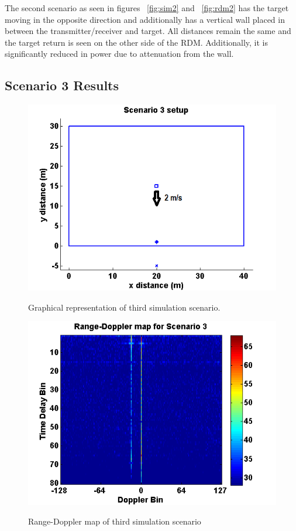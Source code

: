\documentclass[article,11pt,onecolumn,final]{IEEEtran}
\begin{document}
The second scenario as seen in figures ~\ref{fig:sim2} and ~\ref{fig:rdm2} has the target moving in the opposite direction and additionally has a vertical wall placed in between the transmitter/receiver and target. All distances remain the same and the target return is seen on the other side of the RDM. Additionally, it is significantly reduced in power due to attenuation from the wall.

\subsection{Scenario 3 Results}

\begin{figure}[H]
	\caption{Graphical representation of third simulation scenario.}
	\centering
	\includegraphics[width=400pt]{figures/sim3.png}
	\label{fig:sim3}
\end{figure}

\begin{figure}[H]
	\caption{Range-Doppler map of third simulation scenario}
	\centering
	\includegraphics[width=400pt]{figures/rdm3.png}
	\label{fig:rdm3}
\end{figure}
\end{document}

